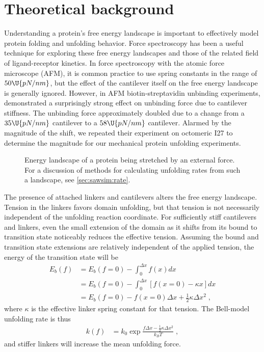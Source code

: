 \section{Theoretical background}
\label{sec:cantilever:theory}

Understanding a protein's free energy landscape is important to
effectively model protein folding and unfolding behavior.  Force
spectroscopy has been a useful technique for exploring these free
energy landscapes and those of the related field of ligand-receptor
kinetics.  In force spectroscopy with the atomic force microscope
(AFM), it is common practice to use spring constants in the range of
$50\U{pN/nm}$, but the effect of the cantilever itself on the free
energy landscape is generally ignored.  However, in AFM
biotin-streptavidin unbinding experiments, \citet{walton08}
demonstrated a surprisingly strong effect on unbinding force due to
cantilever stiffness.  The unbinding force approximately doubled due
to a change from a $35\U{pN/nm}$ cantilever to a $58\U{pN/nm}$
cantilever.  Alarmed by the magnitude of the shift, we repeated their
experiment on octomeric I27 to determine the magnitude for our
mechanical protein unfolding experiments.

\begin{figure}
  \caption{Energy landscape of a protein being stretched by an
    external force.  For a discussion of methods for calculating
    unfolding rates from such a landscape, see
    \cref{sec:sawsim:rate}.\label{fig:landscape:cantilever}}
\end{figure}

The presence of attached linkers and cantilevers alters the free
energy landscape.  Tension in the linkers favors domain unfolding, but
that tension is not necessarily independent of the unfolding reaction
coordinate.  For sufficiently stiff cantilevers and linkers, even the
small extension of the domain as it shifts from its bound to
transition state noticeably reduces the effective tension.  Assuming
the bound and transition state extensions are relatively independent
of the applied tension, the energy of the transition state will be
\begin{align*}
  E_b(f) &= E_b(f=0) - \int_0^{\Delta x} f(x) dx \\
         &= E_b(f=0) - \int_0^{\Delta x} [f(x=0) - \kappa x] dx \\
         &= E_b(f=0) - f(x=0) \Delta x + \frac{1}{2}\kappa \Delta x^2 \;,
\end{align*}
where $\kappa$ is the effective linker spring constant for that
tension.  The Bell-model unfolding rate is thus
\begin{align*}
  k(f) &= k_0 \exp{\frac{f\Delta x - \frac{1}{2}\kappa \Delta x^2}{k_B T}} \;,
\end{align*}
and stiffer linkers will increase the mean unfolding force.

